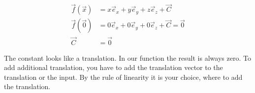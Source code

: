 \documentclass[a4paper]{article}
\begin{document}
\begin{displaymath}
\begin{align}
\vec{f}(\vec{x}) &= x\vec{e}_{x} + y\vec{e}_{y} + z\vec{e}_{z} + \vec{C}\\
\vec{f}(\vec{0}) &= 0\vec{e}_{x} + 0\vec{e}_{y} + 0\vec{e}_{z} + \vec{C} = \vec{0}\\
\vec{C} &= \vec{0}
\end{align}
\end{displaymath}



The constant looks like a translation. In our function the result is always zero. To add additional translation, you have to add the translation vector to the translation or the input. By the rule of linearity it is your choice, where to add the translation.\\



\end{document}

